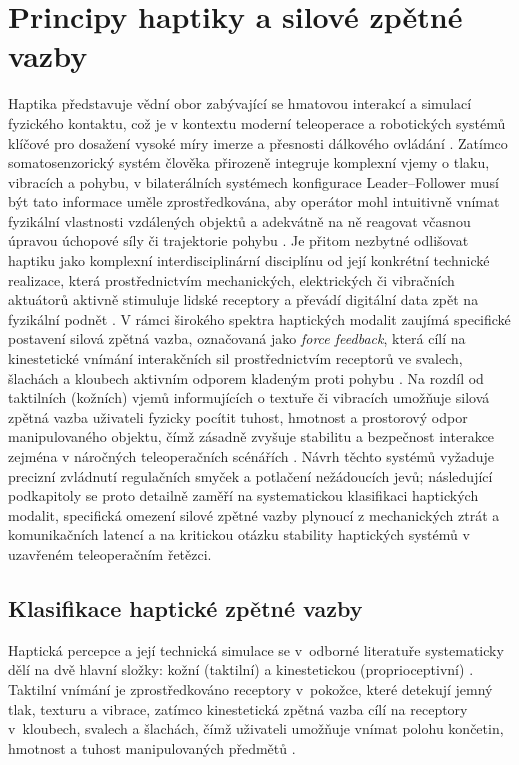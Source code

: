 \section{Principy haptiky a silové zpětné vazby}
Haptika představuje vědní obor zabývající se hmatovou interakcí a simulací fyzického kontaktu, což je v kontextu moderní teleoperace a robotických systémů klíčové pro dosažení vysoké míry imerze a přesnosti dálkového ovládání \cite{GIUDICI2025, Patel2022}. Zatímco somatosenzorický systém člověka přirozeně integruje komplexní vjemy o tlaku, vibracích a pohybu, v bilaterálních systémech konfigurace Leader–Follower musí být tato informace uměle zprostředkována, aby operátor mohl intuitivně vnímat fyzikální vlastnosti vzdálených objektů a adekvátně na ně reagovat včasnou úpravou úchopové síly či trajektorie pohybu \cite{Patel2022, Thomas2023110, GIUDICI2025}. Je přitom nezbytné odlišovat haptiku jako komplexní interdisciplinární disciplínu od její konkrétní technické realizace, která prostřednictvím mechanických, elektrických či vibračních aktuátorů aktivně stimuluje lidské receptory a převádí digitální data zpět na fyzikální podnět \cite{Yang2025, Li2025, Patel2022}.
V rámci širokého spektra haptických modalit zaujímá specifické postavení silová zpětná vazba, označovaná jako \textit{force feedback}, která cílí na kinestetické vnímání interakčních sil prostřednictvím receptorů ve svalech, šlachách a kloubech aktivním odporem kladeným proti pohybu \cite{Patel2022, Yang2025}. Na rozdíl od taktilních (kožních) vjemů informujících o textuře či vibracích umožňuje silová zpětná vazba uživateli fyzicky pocítit tuhost, hmotnost a prostorový odpor manipulovaného objektu, čímž zásadně zvyšuje stabilitu a bezpečnost interakce zejména v náročných teleoperačních scénářích \cite{GIUDICI2025, Patel2022, Li2025}. Návrh těchto systémů vyžaduje precizní zvládnutí regulačních smyček a potlačení nežádoucích jevů; následující podkapitoly se proto detailně zaměří na systematickou klasifikaci haptických modalit, specifická omezení silové zpětné vazby plynoucí z mechanických ztrát a komunikačních latencí a na kritickou otázku stability haptických systémů v uzavřeném teleoperačním řetězci.
\subsection{Klasifikace haptické zpětné vazby}
Haptická percepce a její technická simulace se v~odborné literatuře systematicky dělí na dvě hlavní složky: kožní (taktilní) a kinestetickou (proprioceptivní) \cite{Yang2025, GIUDICI2025, Li2025}.
Taktilní vnímání je zprostředkováno receptory v~pokožce, které detekují jemný tlak, texturu a vibrace, zatímco kinestetická zpětná vazba cílí na receptory v~kloubech, svalech a šlachách, čímž uživateli umožňuje vnímat polohu končetin, hmotnost a tuhost manipulovaných předmětů \cite{Yang2025, Belcamino2024, DAbbraccio201923}.


